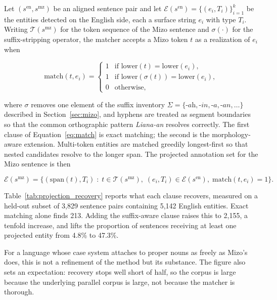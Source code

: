 \documentclass[acmsmall,screen,review]{acmart}
\begin{document}
Let $(s^{\mathrm{en}}, s^{\mathrm{mz}})$ be an aligned sentence pair and let
$\mathcal{E}(s^{\mathrm{en}}) = \{(e_i, T_i)\}_{i=1}^{k}$ be the entities
detected on the English side, each a surface string $e_i$ with type $T_i$.
Writing $\mathcal{T}(s^{\mathrm{mz}})$ for the token sequence of the Mizo
sentence and $\sigma(\cdot)$ for the suffix-stripping operator, the matcher
accepts a Mizo token $t$ as a realization of $e_i$ when

\begin{equation}
\label{eq:match}
\mathrm{match}(t, e_i) =
\begin{cases}
1 & \text{if } \mathrm{lower}(t) = \mathrm{lower}(e_i), \\[2pt]
1 & \text{if } \mathrm{lower}(\sigma(t)) = \mathrm{lower}(e_i), \\[2pt]
0 & \text{otherwise,}
\end{cases}
\end{equation}

where $\sigma$ removes one element of the suffix inventory
$\Sigma = \{\textit{-ah}, \textit{-in}, \textit{-a}, \textit{-an}, \ldots\}$
described in Section~\ref{sec:mizo}, and hyphens are treated as segment
boundaries so that the common orthographic pattern \textit{Liana-an} resolves
correctly. The first clause of Equation~\eqref{eq:match} is exact matching; the
second is the morphology-aware extension. Multi-token entities are matched
greedily longest-first so that nested candidates resolve to the longer span. The
projected annotation set for the Mizo sentence is then

\begin{equation}
\label{eq:project}
\mathcal{E}(s^{\mathrm{mz}}) =
\bigl\{ (\mathrm{span}(t), T_i) \;:\; t \in \mathcal{T}(s^{\mathrm{mz}}),\;
(e_i,T_i) \in \mathcal{E}(s^{\mathrm{en}}),\;
\mathrm{match}(t,e_i) = 1 \bigr\}.
\end{equation}

Table~\ref{tab:projection_recovery} reports what each clause recovers, measured
on a held-out subset of 3,829 sentence pairs containing 5,142 English entities.
Exact matching alone finds 213. Adding the suffix-aware clause raises this to
2,155, a tenfold increase, and lifts the proportion of sentences receiving at
least one projected entity from 4.8\% to 47.3\%.

For a language whose case system attaches to proper nouns as freely as Mizo's
does, this is not a refinement of the method but its substance. The figure also
sets an expectation: recovery stops well short of half, so the corpus is large
because the underlying parallel corpus is large, not because the matcher is
thorough.
\end{document}
